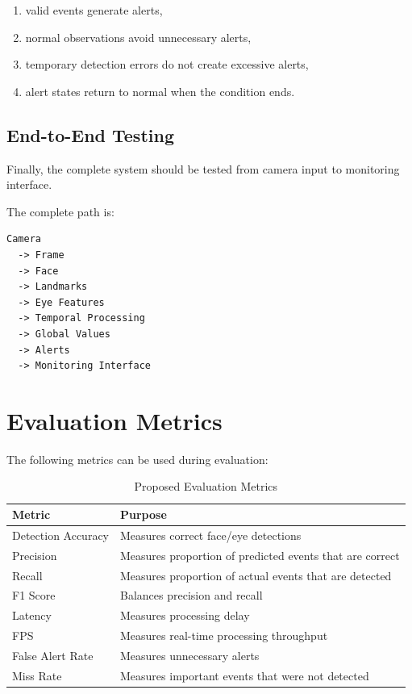 \documentclass[12pt]{tietreport}
\begin{document}
\begin{enumerate}[leftmargin=*]
    \item valid events generate alerts,
    \item normal observations avoid unnecessary alerts,
    \item temporary detection errors do not create excessive alerts,
    \item alert states return to normal when the condition ends.
\end{enumerate}

\subsection{End-to-End Testing}

Finally, the complete system should be tested from camera input to
monitoring interface.

The complete path is:

\begin{center}
\begin{verbatim}
Camera
  -> Frame
  -> Face
  -> Landmarks
  -> Eye Features
  -> Temporal Processing
  -> Global Values
  -> Alerts
  -> Monitoring Interface
\end{verbatim}
\end{center}

\section{Evaluation Metrics}

The following metrics can be used during evaluation:

\begin{table}[H]
\centering
\caption{Proposed Evaluation Metrics}
\begin{tabular}{p{}p{}}
\toprule
\textbf{Metric} & \textbf{Purpose} \\
\midrule
Detection Accuracy & Measures correct face/eye detections \\
Precision & Measures proportion of predicted events that are correct \\
Recall & Measures proportion of actual events that are detected \\
F1 Score & Balances precision and recall \\
Latency & Measures processing delay \\
FPS & Measures real-time processing throughput \\
False Alert Rate & Measures unnecessary alerts \\
Miss Rate & Measures important events that were not detected \\
\bottomrule
\end{tabular}
\end{table}
\end{document}
